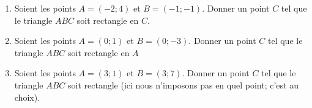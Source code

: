 
\begin{exercice}\label{exoSeconde-0077}

    \begin{enumerate}
        \item
            Soient les points \( A=(-2;4)\) et \( B=(-1;-1)\). Donner un point \( C\) tel que le triangle \( ABC\) soit rectangle en \( C\).
        \item
            Soient les points \( A=(0;1)\) et \( B=(0;-3)\). Donner un point \( C\) tel que le triangle \( ABC\) soit rectangle en \( A\)
        \item
            Soient les points \( A=(3;1)\) et \( B=(3;7)\). Donner un point \( C\) tel que le triangle \( ABC\) soit rectangle (ici nous n'imposons pas en quel point; c'est au choix).
    \end{enumerate}

\end{exercice}
